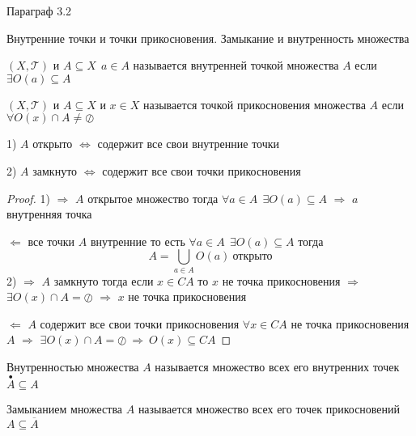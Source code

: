 \begin{title}[\Large]
  Параграф 3.2
\end{title}

\begin{title}[\Large]
  Внутренние точки и точки прикосновения. Замыкание и внутренность множества
\end{title}

\begin{define}
  $(X, \mathcal{T})$ и $A \subseteq X ~~ a \in A$ называется внутренней точкой
  множества $A$ если $\exists O(a) \subseteq A$
\end{define}

\begin{define}
  $(X, \mathcal{T})$  и $A \subseteq X$ и $x \in X$ называется точкой
  прикосновения множества $A$ если $\forall O(x) \cap A \not= \oslash$
\end{define}

\begin{theorem}
  1) $A$ открыто $\Leftrightarrow$ содержит все свои внутренние точки

  2) $A$ замкнуто $\Leftrightarrow$ содержит все свои точки прикосновения
\end{theorem}

\begin{proof}
  1) $\Rightarrow$ $A$ открытое множество тогда $\forall a \in A
  ~~ \exists O(a) \subseteq A$ $\Rightarrow$ $a$ внутренняя точка

  $\Leftarrow$ все точки $A$ внутренние то есть
  $\forall a \in A ~~ \exists O(a) \subseteq A$ тогда
  $$
  A = \bigcup_{a \in A} O(a) ~ \text{открыто}
  $$
  2) $\Rightarrow$ $A$ замкнуто тогда если $x \in CA$
  то $x$ не точка прикосновения $\Rightarrow$ $\exists O(x) \cap A = \oslash$
  $\Rightarrow$ $x$ не точка прикосновения

  $\Leftarrow$ $A$ содержит все свои точки прикосновения $\forall x \in CA$ не
  точка прикосновения $A$ $\Rightarrow$ $\exists O(x) \cap A = \oslash ~
  \Rightarrow ~ O(x) \subseteq CA$
\end{proof}

\begin{define}
  Внутренностью множества $A$ называется множество всех его внутренних точек
  $\stackrel{\bullet}{A} \subseteq A$
\end{define}

\begin{define}[замыкания]
  Замыканием множества $A$ называется множество всех его точек прикосновений
  $A \subseteq \overline{A}$
\end{define}

